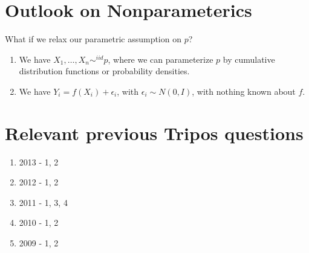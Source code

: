 \section{Outlook on Nonparameterics}
\label{sec:outl-nonp}

What if we relax our parametric assumption on $p$?

\begin{enumerate}
\item We have $X_{1}, \dots, X_{n} \sim^{iid} p$, where we can
  parameterize $p$ by cumulative distribution functions or probability
  densities.
\item We have $Y_{i} = f(X_{i}) + \epsilon_{i}$, with $\epsilon_{i}
  \sim N(0, I)$, with nothing known about $f$.
\end{enumerate}

\section{Relevant previous Tripos questions}
\label{sec:relev-prev-trip}

\begin{enumerate}
\item 2013 - 1, 2
\item 2012 - 1, 2
\item 2011 - 1, 3, 4
\item 2010 - 1, 2
\item 2009 - 1, 2
\end{enumerate}

